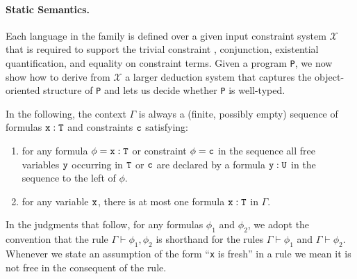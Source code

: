 \paragraph{Static Semantics.}
Each language in the family is defined over a given input constraint system $\mathcal{X}$ that is required to support the trivial constraint \true{}, conjunction, existential quantification, and equality on constraint terms. Given a program {\tt P}, we now show how to derive from $\mathcal{X}$ a larger deduction system that captures the object-oriented structure of {\tt P} and lets us decide whether {\tt P} is well-typed.

In the following, the context $\Gamma$ is always a
(finite, possibly empty) sequence of formulas $\tt x:T$ and constraints $\tt c$ satisfying:
\begin{enumerate}
  \item for any formula $\phi=\tt x:T$ or constraint $\phi=\tt c$ in the sequence all free variables $\tt y$
  occurring in $\tt T$ or $\tt c$ are declared by a formula $\tt
  y:U$ in the sequence to the left of $\phi$.

  \item for any variable $\tt x$, there is at most one
  formula $\tt x:T$ in $\Gamma$.
\end{enumerate}

\medskip

In the judgments that follow, 
for any formulas $\phi_1$ and
$\phi_2$, we adopt the convention that the rule $\Gamma \vdash \phi_1, \phi_2$
is shorthand for the rules
$\Gamma \vdash \phi_1$
and
$\Gamma \vdash \phi_2$. Whenever
we state an assumption of the form ``{\tt x} is fresh'' in a rule we mean
it is not free in the consequent of the rule.

